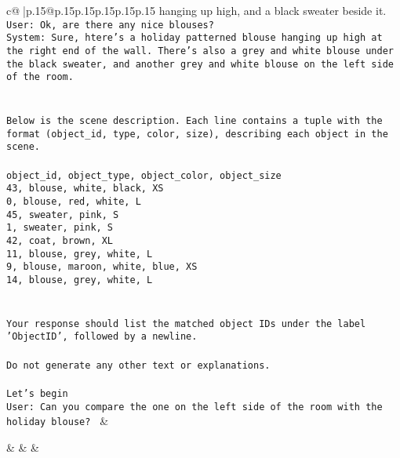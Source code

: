 \documentclass{article}
\begin{document}
{\begin{supertabular}{c@{$\;$}|p{.15\linewidth}@{}p{.15\linewidth}p{.15\linewidth}p{.15\linewidth}p{.15\linewidth}p{.15\linewidth}}
{{{hanging up high, and a black sweater beside it.\\ \tt User: Ok, are there any nice blouses?\\ \tt System: Sure, htere's a holiday patterned blouse hanging up high at the right end of the wall.  There's also a grey and white blouse under the black sweater, and another grey and white blouse on the left side of the room.\\ \tt \\ \tt \\ \tt Below is the scene description. Each line contains a tuple with the format (object_id, type, color, size), describing each object in the scene.\\ \tt \\ \tt object_id, object_type, object_color, object_size\\ \tt 43, blouse, white, black, XS\\ \tt 0, blouse, red, white, L\\ \tt 45, sweater, pink, S\\ \tt 1, sweater, pink, S\\ \tt 42, coat, brown, XL\\ \tt 11, blouse, grey, white, L\\ \tt 9, blouse, maroon, white, blue, XS\\ \tt 14, blouse, grey, white, L\\ \tt \\ \tt \\ \tt Your response should list the matched object IDs under the label 'ObjectID', followed by a newline.\\ \tt \\ \tt Do not generate any other text or explanations.\\ \tt \\ \tt Let's begin\\ \tt User: Can you compare the one on the left side of the room with the holiday blouse? 
	  } 
	   } 
	   } 
	 & \\ 
 

    \theutterance {}  

    &  
	 & & \\ 
 

    \theutterance {}  


\end{supertabular}}
\end{document}
